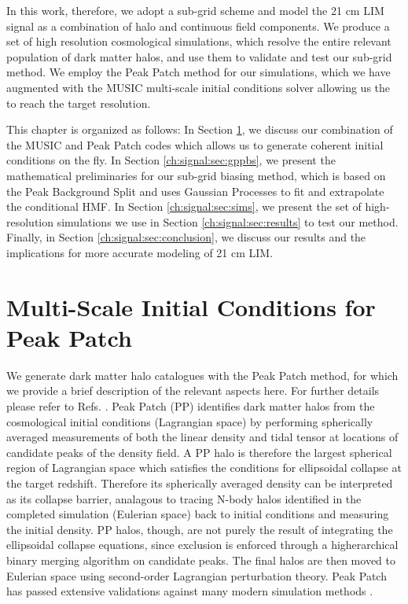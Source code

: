 In this work, therefore, we adopt a sub-grid scheme and model the 21 cm LIM signal as a combination of halo and continuous field components. We produce a set of high resolution cosmological simulations, which resolve the entire relevant population of dark matter halos, and use them to validate and test our sub-grid method. We employ the Peak Patch \citep{peakpatch1} method for our simulations, which we have augmented with the MUSIC multi-scale initial conditions solver allowing us the to reach the target resolution. 

This chapter is organized as follows: In Section \ref{ch:signal:sec:music}, we discuss our combination of the MUSIC and Peak Patch codes which allows us to generate coherent initial conditions on the fly. In Section \ref{ch:signal:sec:gppbs}, we present the mathematical preliminaries for our sub-grid biasing method, which is based on the Peak Background Split \cite{schmidt2013} and uses Gaussian Processes \cite{rasmussenandwilliams} to fit and extrapolate the conditional HMF. In Section \ref{ch:signal:sec:sims}, we present the set of high-resolution simulations we use in Section \ref{ch:signal:sec:results} to test our method. Finally, in Section \ref{ch:signal:sec:conclusion}, we discuss our results and the implications for more accurate modeling of 21 cm LIM.

\section{Multi-Scale Initial Conditions for Peak Patch}
\label{ch:signal:sec:music}

We generate dark matter halo catalogues with the Peak Patch method, for which we provide a brief description of the relevant aspects here. For further details please refer to Refs. \citep{peakpatch,peakpatch2,peakpatch3}. Peak Patch (PP) identifies dark matter halos from the cosmological initial conditions (Lagrangian space) by performing spherically averaged measurements of both the linear density and tidal tensor at locations of candidate peaks of the density field. A PP halo is therefore the largest spherical region of Lagrangian space which satisfies the conditions for ellipsoidal collapse at the target redshift. Therefore its spherically averaged density can be interpreted as its collapse barrier, analagous to tracing N-body halos identified in the completed simulation (Eulerian space) back to initial conditions and measuring the initial density. PP halos, though, are not purely the result of integrating the ellipsoidal collapse equations, since exclusion is enforced through a higherarchical binary merging algorithm on candidate peaks. The final halos are then moved to Eulerian space using second-order Lagrangian perturbation theory. Peak Patch has passed extensive validations against many modern simulation methods \cite{euclidcp1, euclidcp2, euclidcp3}.

